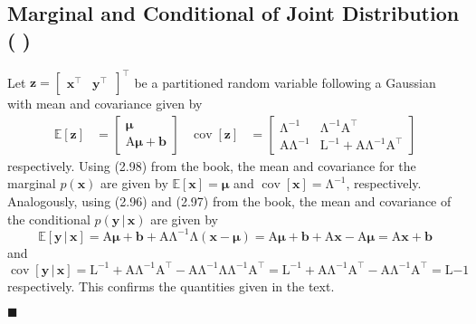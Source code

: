 \documentclass[11pt, a4paper]{scrartcl}
\newcommand{\E}{\mathbb{E}}
\DeclareMathOperator{\cov}{cov}
\newcommand{\transposed}{{\!\top\!}}
\renewcommand{\vec}[1]{\bm{#1}}
\newcommand{\mat}[1]{\bm{\mathrm{#1}}}
\newcommand{\given}{\,\vert\,}
\newcommand{\eot}{\hfill\(\blacksquare\)}
\newcommand{\diffstar}{\texorpdfstring{\raisebox{-1pt}{\resizebox{!}{8pt}{\(\star\)}}}{*}}
\newcommand{\threestar}{(\diffstar\,\diffstar\,\diffstar)}
\begin{document}
		\subsection{Marginal and Conditional of Joint Distribution  \threestar}
			Let \( \vec{z} = \begin{bmatrix} \vec{x}^\transposed & \vec{y}^{\transposed\,} \end{bmatrix}^\transposed \) be a partitioned random variable following a Gaussian with mean and covariance given by
			\begin{align}
				\E[\vec{z}] &= \begin{bmatrix} \vec{\mu} \\ \mat{A} \vec{\mu} + \vec{b} \end{bmatrix} &
				\cov[\vec{z}] &= \begin{bmatrix} \mat{\Lambda}^{-1} & \mat{\Lambda}^{-1} \mat{A}^\transposed \\ \mat{A} \mat{\Lambda}^{-1} & \mat{L}^{-1} + \mat{A} \mat{\Lambda}^{-1} \mat{A}^\transposed \end{bmatrix}
			\end{align}
			respectively. Using (2.98) from the book, the mean and covariance for the marginal \( p(\vec{x}) \) are given by \( \E[\vec{x}] = \vec{\mu} \) and \( \cov[\vec{x}] = \mat{\Lambda}^{-1} \), respectively. Analogously, using (2.96) and (2.97) from the book, the mean and covariance of the conditional \( p(\vec{y} \given \vec{x}) \) are given by
			\begin{equation}
				\E[\vec{y} \given \vec{x}]
					= \mat{A} \vec{\mu} + \vec{b} + \mat{A} \mat{\Lambda}^{-1} \mat{\Lambda} (\vec{x} - \vec{\mu})
					= \mat{A} \vec{\mu} + \vec{b} + \mat{A} \vec{x} - \mat{A} \vec{\mu}
					= \mat{A} \vec{x} + \vec{b}
			\end{equation}
			and
			\begin{equation}
				\cov[\vec{y} \given \vec{x}]
					= \mat{L}^{-1} + \mat{A} \mat{\Lambda}^{-1} \mat{A}^\transposed - \mat{A} \mat{\Lambda}^{-1} \mat{\Lambda} \mat{\Lambda}^{-1} \mat{A}^\transposed
					= \mat{L}^{-1} + \mat{A} \mat{\Lambda}^{-1} \mat{A}^\transposed - \mat{A} \mat{\Lambda}^{-1} \mat{A}^\transposed
					= \mat{L}{-1}
			\end{equation}
			respectively. This confirms the quantities given in the text.

			\eot
\end{document}
